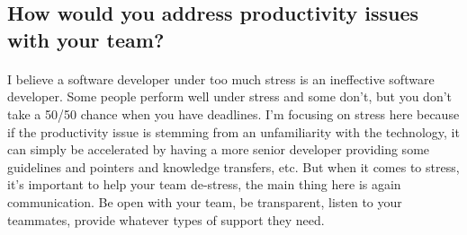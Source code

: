 \documentclass{article}
\begin{document}
\subsection{How would you address productivity issues with your team?}

\paragraph{}

	I believe a software developer under too much stress is an ineffective software developer. Some people perform well under stress and some don't, but you don't take a 50/50 chance when you have deadlines. I'm focusing on stress here because if the productivity issue is stemming from an unfamiliarity with the technology, it can simply be accelerated by having a more senior developer providing some guidelines and pointers and knowledge transfers, etc. But when it comes to stress, it's important to help your team de-stress, the main thing here is again communication. Be open with your team, be transparent, listen to your teammates, provide whatever types of support they need. 
\end{document}
